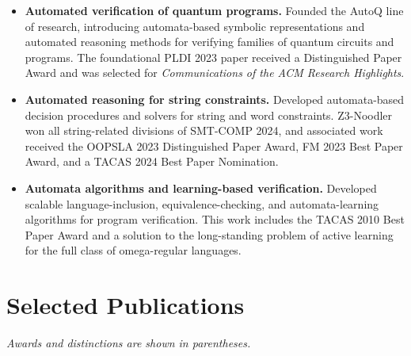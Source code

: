 \documentclass[11pt,a4paper]{article}
\begin{document}
\begin{itemize}
  \item \textbf{Automated verification of quantum programs.}
  Founded the AutoQ line of research, introducing automata-based symbolic
  representations and automated reasoning methods for verifying families of
  quantum circuits and programs. The foundational PLDI 2023 paper received a
  Distinguished Paper Award and was selected for \emph{Communications of the ACM
  Research Highlights}.

  \item \textbf{Automated reasoning for string constraints.}
  Developed automata-based decision procedures and solvers for string and word
  constraints. Z3-Noodler won all string-related divisions of SMT-COMP 2024,
  and associated work received the OOPSLA 2023 Distinguished Paper Award,
  FM 2023 Best Paper Award, and a TACAS 2024 Best Paper Nomination.

  \item \textbf{Automata algorithms and learning-based verification.}
  Developed scalable language-inclusion, equivalence-checking, and
  automata-learning algorithms for program verification. This work includes
  the TACAS 2010 Best Paper Award and a solution to the long-standing problem
  of active learning for the full class of omega-regular languages.
\end{itemize}

\section{Selected Publications}

\textit{Awards and distinctions are shown in parentheses.}
\end{document}
